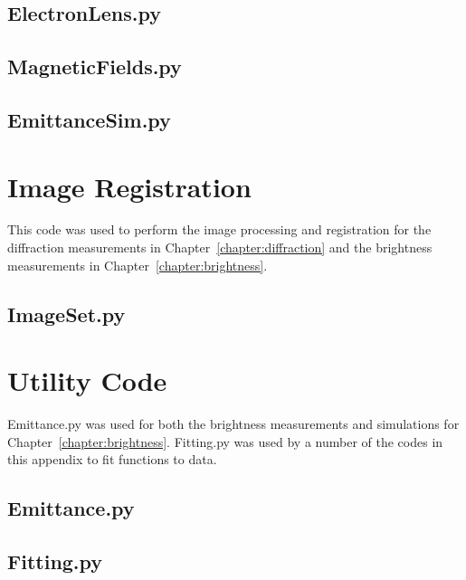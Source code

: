 \subsection{ElectronLens.py}


\subsection{MagneticFields.py}


\subsection{EmittanceSim.py}



\newpage
\section{Image Registration}

This code was used to perform the image processing and registration for the diffraction measurements in Chapter~\ref{chapter:diffraction} and the brightness measurements in Chapter~\ref{chapter:brightness}.

\subsection{ImageSet.py}


\newpage
\section{Utility Code}

Emittance.py was used for both the brightness measurements and simulations for Chapter~\ref{chapter:brightness}.
Fitting.py was used by a number of the codes in this appendix to fit functions to data.

\subsection{Emittance.py}


\subsection{Fitting.py}
